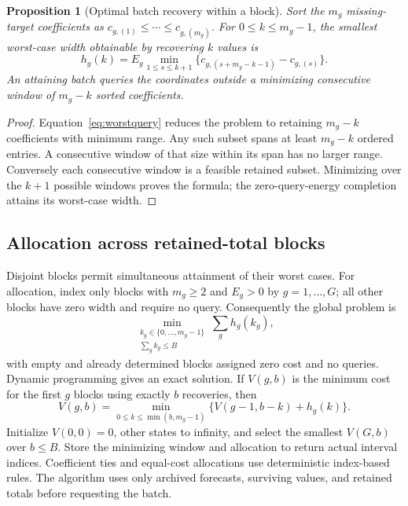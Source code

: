 \documentclass[12pt]{article}
\newtheorem{proposition}{Proposition}
\begin{document}
\begin{proposition}[Optimal batch recovery within a block]
Sort the $m_g$ missing-target coefficients as
$c_{g,(1)}\leq\cdots\leq c_{g,(m_g)}$. For $0\leq k\leq m_g-1$, the
smallest worst-case width obtainable by recovering $k$ values is
\begin{equation}
 h_g(k)=E_g\min_{1\leq s\leq k+1}
 \{c_{g,(s+m_g-k-1)}-c_{g,(s)}\}.
 \label{eq:window}
\end{equation}
An attaining batch queries the coordinates outside a minimizing consecutive
window of $m_g-k$ sorted coefficients.
\end{proposition}
\begin{proof}
Equation~\eqref{eq:worstquery} reduces the problem to retaining $m_g-k$
coefficients with minimum range. Any such subset spans at least $m_g-k$
ordered entries. A consecutive window of that size within its span has no
larger range. Conversely each consecutive window is a feasible retained
subset. Minimizing over the $k+1$ possible windows proves the formula;
the zero-query-energy completion attains its worst-case width.
\end{proof}

\subsection{Allocation across retained-total blocks}
Disjoint blocks permit simultaneous attainment of their worst cases.
For allocation, index only blocks with $m_g\geq2$ and $E_g>0$ by
$g=1,\ldots,G$; all other blocks have zero width and require no query.
Consequently the global problem is
\begin{equation}
 \min_{\substack{k_g\in\{0,\ldots,m_g-1\}\\\sum_g k_g\leq B}}
 \sum_g h_g(k_g),
 \label{eq:allocation}
\end{equation}
with empty and already determined blocks assigned zero cost and no queries.
Dynamic programming gives an exact solution. If $V(g,b)$ is the minimum
cost for the first $g$ blocks using exactly $b$ recoveries, then
\begin{equation}
 V(g,b)=\min_{0\leq k\leq\min(b,m_g-1)}
 \{V(g-1,b-k)+h_g(k)\}.
\end{equation}
Initialize $V(0,0)=0$, other states to infinity, and select the smallest
$V(G,b)$ over $b\leq B$. Store the minimizing window and allocation to
return actual interval indices. Coefficient ties and equal-cost allocations
use deterministic index-based rules. The algorithm uses only archived
forecasts, surviving values, and retained totals before requesting the batch.
\end{document}
